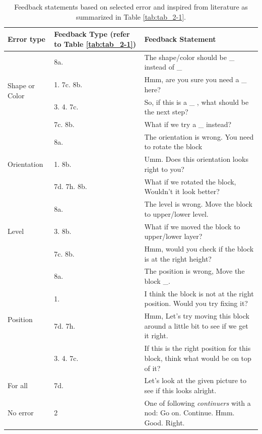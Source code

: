 \begin{table}[]
    \centering
\begin{tabular}{ | m{2cm} | m{3cm}| m{8cm} | } 
\hline
\textbf{Error type} & \textbf{Feedback Type} (refer to Table \ref{tab:tab_2-1}) & \textbf{Feedback Statement} \\ 
\hline
\multirow{4}{4em}{Shape or Color}  & 8a. & The shape/color should be \_ instead of \_ \\ \cline{2-3}
& 1. 7c. 8b. & Hmm, are you sure you need a \_ here? \\ \cline{2-3}
& 3. 4. 7c. & So, if this is a \_ , what should be the next step?\\ \cline{2-3}
& 7c. 8b. & What if we try a \_ instead?\\ \cline{2-3}
\hline
\multirow{3}{4em}{Orientation}  & 8a. & The orientation is wrong. You need to rotate the block \\ \cline{2-3}
& 1. 8b. & Umm. Does this orientation looks right to you? \\\cline{2-3}
& 7d. 7h. 8b.  & What if we rotated the block, Wouldn't it look better? \\
\hline
\multirow{3}{4em}{Level}  & 8a. & The level is wrong. Move the block to upper/lower level. \\ \cline{2-3}
& 3. 8b. & What if we moved the block to upper/lower layer?\\ \cline{2-3}
& 7c. 8b. & Hmm, would you check if the block is at the right height?\\ 
\hline
\multirow{4}{4em}{Position}  & 8a. & The position is wrong, Move the block \_.  \\ \cline{2-3}
& 1. & I think the block is not at the right position. Would you try fixing it?\\ \cline{2-3}
& 7d. 7h. & Hmm, Let's try moving this block around a little bit to see if we get it right.\\ \cline{2-3}
& 3. 4. 7c. & If this is the right position for this block, think what would be on top of it?\\ 
\hline
For all  & 7d. & Let's look at the given picture to see if this looks alright. \\ 
\hline
No error & 2 & One of following \emph{continuers} with a nod: Go on. Continue. Hmm. Good. Right. \\
\hline
\end{tabular}
  \caption{Feedback statements based on selected error and inspired from literature as summarized in Table \ref{tab:tab_2-1}.}
    \label{tab:tab_3-1}
\end{table}

